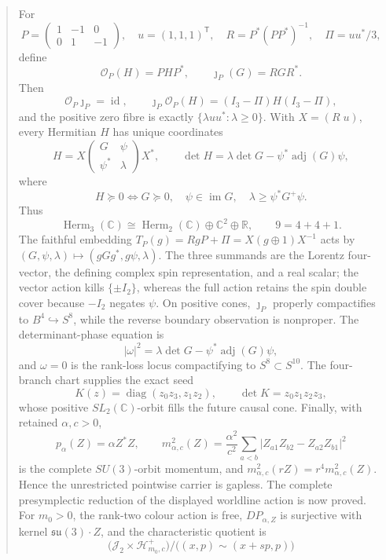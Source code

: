 \documentclass[11pt,letterpaper]{article}
\theoremstyle{definition}
\theoremstyle{remark}
\begin{document}
\begin{abstract}
 For
 \[
  P=\begin{pmatrix}1&-1&0\\0&1&-1\end{pmatrix},\quad
  u=(1,1,1)^{\mathsf T},\quad
  R=P^*(PP^*)^{-1},\quad \Pi=uu^*/3,
 \]
 define
 \[
  \mathcal O_P(H)=PHP^*,\qquad \jmath_P(G)=RGR^*.
 \]
 Then
 \[
  \mathcal O_P\jmath_P=\operatorname{id},\qquad
  \jmath_P\mathcal O_P(H)=(I_3-\Pi)H(I_3-\Pi),
 \]
 and the positive zero fibre is exactly
 \(\{\lambda uu^*: \lambda\geq0\}\).  With \(X=(R\;u)\), every
 Hermitian \(H\) has unique coordinates
 \[
  H=X\begin{pmatrix}G&\psi\\\psi^*&\lambda\end{pmatrix}X^*,\qquad
  \det H=\lambda\det G-\psi^*\operatorname{adj}(G)\psi,
 \]
 where
 \[
  H\succeq0\Longleftrightarrow
  G\succeq0,\quad\psi\in\operatorname{im}G,\quad
  \lambda\geq\psi^*G^+\psi.
 \]
 Thus
 \[
  \operatorname{Herm}_3(\mathbb C)
  \cong\operatorname{Herm}_2(\mathbb C)\oplus\mathbb C^2\oplus\mathbb R,
  \qquad9=4+4+1.
 \]
 The faithful embedding
 \(T_P(g)=RgP+\Pi=X(g\oplus1)X^{-1}\) acts by
 \((G,\psi,\lambda)\mapsto(gGg^*,g\psi,\lambda)\).  The three summands
 are the Lorentz four-vector, the defining complex spin representation, and
 a real scalar; the vector action kills \(\{\pm I_2\}\), whereas the full
 action retains the spin double cover because \(-I_2\) negates \(\psi\).
 On positive cones, \(\jmath_P\) properly compactifies to
 \(B^4\hookrightarrow S^8\), while the reverse boundary observation is
 nonproper.  The determinant-phase equation is
 \[
  |\omega|^2=\lambda\det G-\psi^*\operatorname{adj}(G)\psi,
 \]
 and \(\omega=0\) is the rank-loss locus compactifying to
 \(S^8\subset S^{10}\).  The four-branch chart supplies the exact seed
 \[
  K(z)=\operatorname{diag}(z_0z_3,z_1z_2),\qquad
  \det K=z_0z_1z_2z_3,
 \]
 whose positive \(SL_2(\mathbb C)\)-orbit fills the future causal cone.
 Finally, with retained \(\alpha,c>0\),
 \[
  p_\alpha(Z)=\alpha Z^*Z,\qquad
  m_{\alpha,c}^2(Z)=\frac{\alpha^2}{c^2}
  \sum_{a<b}|Z_{a1}Z_{b2}-Z_{a2}Z_{b1}|^2
 \]
 is the complete \(SU(3)\)-orbit momentum, and
 \(m_{\alpha,c}^2(rZ)=r^4m_{\alpha,c}^2(Z)\).  Hence the unrestricted
 pointwise carrier is gapless.  The complete presymplectic reduction of the
 displayed worldline action is now proved.  For \(m_0>0\), the rank-two
 colour action is free, \(DP_{\alpha,Z}\) is surjective with kernel
 \(\mathfrak{su}(3)\cdot Z\), and the characteristic quotient is
 \[
  \bigl(\mathcal J_2\times\mathcal H^+_{m_0,c}\bigr)/
  \bigl((x,p)\sim(x+sp,p)\bigr)
\]
\end{abstract}
\end{document}
